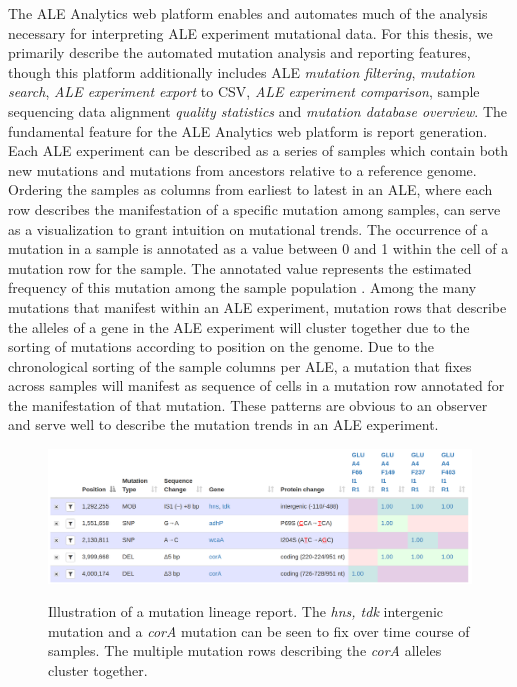 \documentclass[12pt,final,masters,chapterheads]{ucsd}  %
\begin{document}
The ALE Analytics web platform enables and automates much of the analysis necessary for interpreting ALE experiment mutational data. For this thesis, we primarily describe the automated mutation analysis and reporting features, though this platform additionally includes ALE \textit{mutation filtering},  \textit{mutation search}, \textit{ALE experiment export} to CSV, \textit{ALE experiment comparison}, sample sequencing data alignment \textit{quality statistics} and \textit{mutation database overview}. The fundamental feature for the ALE Analytics web platform is report generation. Each ALE experiment can be described as a series of samples which contain both new mutations and mutations from ancestors relative to a reference genome. Ordering the samples as columns from earliest to latest in an ALE, where each row describes the manifestation of a specific mutation among samples, can serve as a visualization to grant intuition on mutational trends. The occurrence of a mutation in a sample is annotated as a value between 0 and 1 within the cell of a mutation row for the sample. The annotated value represents the estimated frequency of this mutation among the sample population \cite{breseq_paper}. Among the many mutations that manifest within an ALE experiment, mutation rows that describe the alleles of a gene in the ALE experiment will cluster together due to the sorting of mutations according to position on the genome. Due to the chronological sorting of the sample columns per ALE, a mutation that fixes across samples will manifest as sequence of cells in a mutation row annotated for the manifestation of that mutation. These patterns are obvious to an observer and serve well to describe the mutation trends in an ALE experiment.

\begin{figure}[H]
  \caption{Illustration of a mutation lineage report. The \textit{hns, tdk} intergenic mutation and a \textit{corA} mutation can be seen to fix over time course of samples. The multiple mutation rows describing the \textit{corA} alleles cluster together.}
  \centering
  \includegraphics[width=1\textwidth]{mutation_lineage_report.png}
  \label{fig:mutation_lineage_report}
\end{figure}
\end{document}
